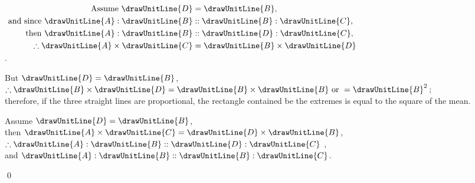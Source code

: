 \documentclass[booklanguage=english]{byrnebook}
\begin{document}
\begin{center}
$\begin{aligned}
\mbox{ Assume } \drawUnitLine{D} &= \drawUnitLine{B}, \\
\mbox{ and since } \drawUnitLine{A} : \drawUnitLine{B} &:: \drawUnitLine{B} : \drawUnitLine{C}, \\
\mbox{ then } \drawUnitLine{A} : \drawUnitLine{B} &:: \drawUnitLine{D} : \drawUnitLine{C}, \\
\therefore \drawUnitLine{A} \times \drawUnitLine{C} &= \drawUnitLine{B} \times \drawUnitLine{D} \\
\end{aligned}$\\
.

But $\drawUnitLine{D} = \drawUnitLine{B}$,\\
$\therefore \drawUnitLine{B} \times \drawUnitLine{D} = \drawUnitLine{B} \times \drawUnitLine{B} \mbox{ or } = \drawUnitLine{B}^2$;\\
therefore, if the three straight lines are proportional, the rectangle contained be the extremes is equal to the square of the mean.
\end{center}

\begin{center}
Assume $\drawUnitLine{D} = \drawUnitLine{B}$,\\
then $\drawUnitLine{A} \times \drawUnitLine{C} = \drawUnitLine{D} \times \drawUnitLine{B}$,\\
$\therefore \drawUnitLine{A} : \drawUnitLine{B} :: \drawUnitLine{D} : \drawUnitLine{C}$ ,\\
and $\drawUnitLine{A} : \drawUnitLine{B} :: \drawUnitLine{B} : \drawUnitLine{C}$.
\end{center}

\qed
\end{document}
